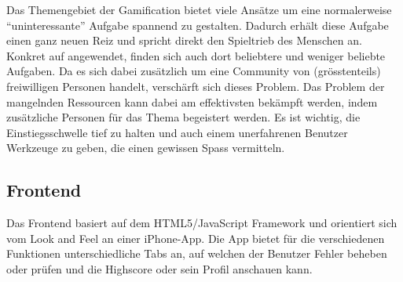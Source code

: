 Das Themengebiet der \gls{Gamification} bietet viele Ansätze um eine normalerweise "`uninteressante"' Aufgabe spannend zu gestalten.
Dadurch erhält diese Aufgabe einen ganz neuen Reiz und spricht direkt den Spieltrieb des Menschen an.
Konkret auf  angewendet, finden sich auch dort beliebtere und weniger beliebte Aufgaben.
Da es sich dabei zusätzlich um eine Community von (grösstenteils) freiwilligen Personen handelt, verschärft sich dieses Problem.
Das Problem der mangelnden Ressourcen kann dabei am effektivsten bekämpft werden, indem zusätzliche Personen für das Thema begeistert werden.
Es ist wichtig, die Einstiegsschwelle tief zu halten und auch einem unerfahrenen Benutzer Werkzeuge zu geben, die einen gewissen Spass vermitteln.

\subsection*{Frontend}
Das Frontend basiert auf dem HTML5/JavaScript Framework  und orientiert sich vom Look and Feel an einer iPhone-App.
Die App bietet für die verschiedenen Funktionen unterschiedliche Tabs an, auf welchen der Benutzer Fehler beheben oder prüfen und die Highscore oder sein Profil anschauen kann.

